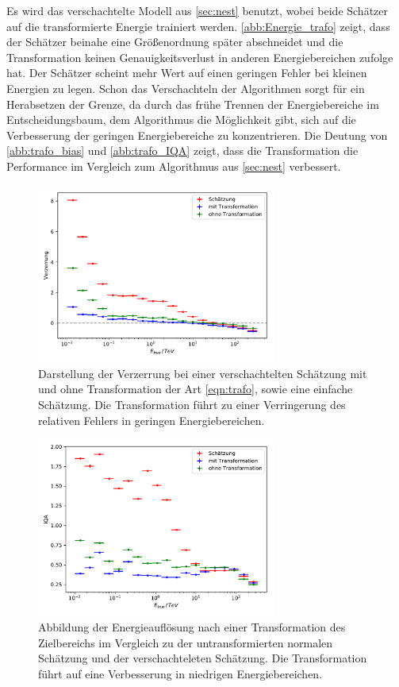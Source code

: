 Es wird das verschachtelte Modell aus \autoref{sec:nest} benutzt, wobei beide Schätzer auf die transformierte Energie trainiert werden.
\autoref{abb:Energie_trafo} zeigt, dass der Schätzer beinahe eine Größenordnung später abschneidet und die Transformation keinen Genauigkeitsverlust
in anderen Energiebereichen zufolge hat.
Der Schätzer scheint mehr Wert auf einen geringen Fehler bei kleinen Energien zu legen.
Schon das Verschachteln der Algorithmen sorgt für ein Herabsetzen der Grenze, da durch das frühe Trennen der Energiebereiche im Entscheidungsbaum, dem
Algorithmus die Möglichkeit gibt, sich auf die Verbesserung der geringen Energiebereiche zu konzentrieren.
Die Deutung von \autoref{abb:trafo_bias} und \autoref{abb:trafo_IQA} zeigt, dass die Transformation die Performance im Vergleich
zum Algorithmus aus \ref{sec:nest} verbessert.
\begin{figure}
  \includegraphics[width=0.7\textwidth]{Plots/trafo_nested_bias.pdf}
  \centering
  \caption{Darstellung der Verzerrung bei einer verschachtelten Schätzung mit und ohne Transformation der Art \eqref{eqn:trafo}, sowie eine einfache Schätzung. Die Transformation führt zu einer Verringerung
          des relativen Fehlers in geringen Energiebereichen.}
  \label{abb:trafo_bias}
\end{figure}
\begin{figure}
  \includegraphics[width=0.7\textwidth]{Plots/trafo_nested_resolution.pdf}
  \centering
  \caption{Abbildung der Energieauflösung nach einer Transformation des Zielbereichs im Vergleich zu der untransformierten normalen Schätzung und der verschachteleten Schätzung. Die Transformation führt auf eine
          Verbesserung in niedrigen Energiebereichen.}
  \label{abb:trafo_IQA}
\end{figure}
